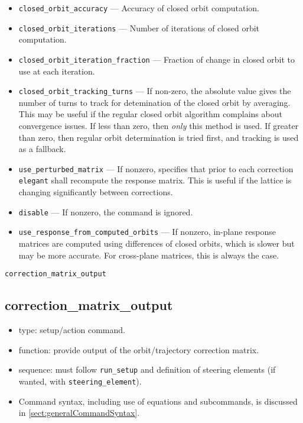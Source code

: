\documentclass[11pt]{article}
\begin{document}
\begin{itemize}
should employ tracking of the beam distribution rather than a single
particle.  This is valid for trajectory correction only.
\item \verb|closed_orbit_accuracy| --- Accuracy of closed orbit computation.
\item \verb|closed_orbit_iterations| --- Number of iterations of closed orbit computation.
\item \verb|closed_orbit_iteration_fraction| --- Fraction of change in closed orbit to
use at each iteration.
\item \verb|closed_orbit_tracking_turns| --- If non-zero, the absolute value gives the number of turns to track for detemination 
  of the closed orbit by averaging. This may be useful if the regular closed orbit algorithm
  complains about convergence issues. If less than zero, then {\em only} this method is used. If greater than zero, 
  then regular orbit determination is tried first, and tracking is used as a fallback.
\item \verb|use_perturbed_matrix| --- If nonzero, specifies that prior to each 
	correction \verb|elegant| shall recompute the response matrix.  This
	is useful if the lattice is changing significantly between corrections.
\item \verb|disable| --- If nonzero, the command is ignored.
\item \verb|use_response_from_computed_orbits| --- If nonzero, in-plane response matrices are computed
  using differences of closed orbits, which is slower but may be more accurate. For cross-plane matrices, this is always the case.
\end{itemize}

\newpage
\begin{center}{\Large\verb|correction_matrix_output|}\end{center}
\subsection{correction\_matrix\_output \label{subsec:correctionmatrixoutput}}

\begin{itemize}
\item type: setup/action command.
\item function: provide output of the orbit/trajectory correction matrix.
\item sequence: must follow \verb|run_setup| and definition of steering elements (if wanted, with \verb|steering_element|).
\item Command syntax, including use of equations and subcommands, is discussed in \ref{sect:generalCommandSyntax}.
\end{itemize}
\end{document}
